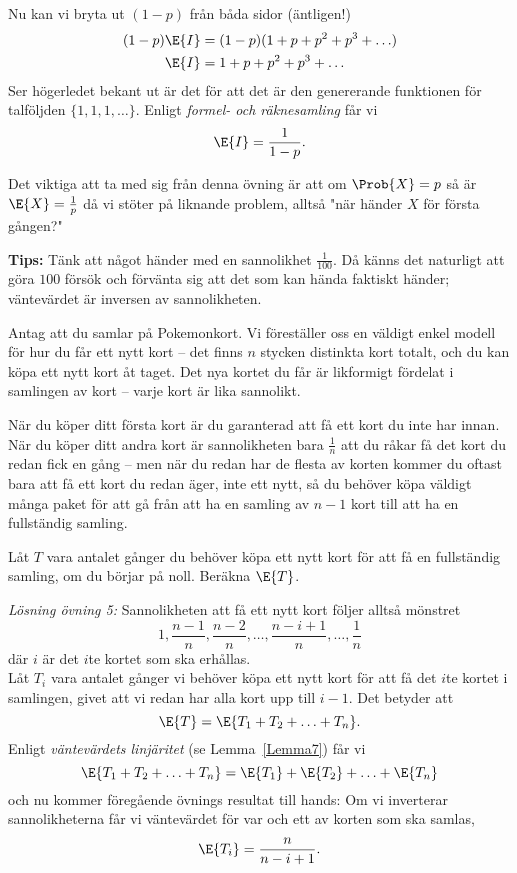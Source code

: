 \documentclass[nobib]{tufte-handout}
\begin{document}
Nu kan vi bryta ut $(1-p)$ från båda sidor (äntligen!)
    \begin{align*}
        (1-p)\E{I} &=(1-p)(1+p+p^2+p^3+\ldots)\\
        \E{I} &=1+p+p^2+p^3+\ldots
    \end{align*}
Ser högerledet bekant ut är det för att det är den genererande funktionen för talföljden $\{1,1,1,\ldots\}$. Enligt \textit{formel- och räknesamling} får vi
$$\E{I}=\frac{1}{1-p}.$$

Det viktiga att ta med sig från denna övning är att om $\Prob{X}=p$ så är $\E{X}=\frac{1}{p}$ då vi stöter på liknande problem, alltså "när händer $X$ för första gången?"

    \textbf{Tips:} Tänk att något händer med en sannolikhet $\frac{1}{100}$. Då känns det naturligt att göra $100$ försök och förvänta sig att det som kan hända faktiskt händer; väntevärdet är inversen av sannolikheten.

\begin{xca}
    Antag att du samlar på Pokemonkort. Vi föreställer oss en väldigt enkel modell för hur du får ett nytt kort -- det finns $n$ stycken distinkta kort totalt, och du kan köpa ett nytt kort åt taget. Det nya kortet du får är likformigt fördelat i samlingen av kort -- varje kort är lika sannolikt.

    När du köper ditt första kort är du garanterad att få ett kort du inte har innan. När du köper ditt andra kort är sannolikheten bara $\frac{1}{n}$ att du råkar få det kort du redan fick en gång -- men när du redan har de flesta av korten kommer du oftast bara att få ett kort du redan äger, inte ett nytt, så du behöver köpa väldigt många paket för att gå från att ha en samling av $n-1$ kort till att ha en fullständig samling.

    Låt $T$ vara antalet gånger du behöver köpa ett nytt kort för att få en fullständig samling, om du börjar på noll. Beräkna $\E{T}$.
\end{xca}

\textit{Lösning övning 5:} Sannolikheten att få ett nytt kort följer alltså mönstret $$1, \frac{n-1}{n}, \frac{n-2}{n}, \ldots, \frac{n-i+1}{n}, \ldots, \frac{1}{n}$$ där $i$ är det $i$te kortet som ska erhållas.\\
Låt $T_i$ vara antalet gånger vi behöver köpa ett nytt kort för att få det $i$te kortet i samlingen, givet att vi redan har alla kort upp till $i-1$. Det betyder att $$\E{T}=\E{T_1+T_2+\ldots+T_n}.$$
Enligt \emph{väntevärdets linjäritet} (se Lemma~\ref{Lemma7}) får vi $$\E{T_1+T_2+\ldots+T_n} = \E{T_1} + \E{T_2}+ \ldots + \E{T_n}$$ och nu kommer föregående övnings resultat till hands: Om vi inverterar sannolikheterna får vi väntevärdet för var och ett av korten som ska samlas, $$\E{T_i} = \frac{n}{n-i+1}.$$
\end{document}
